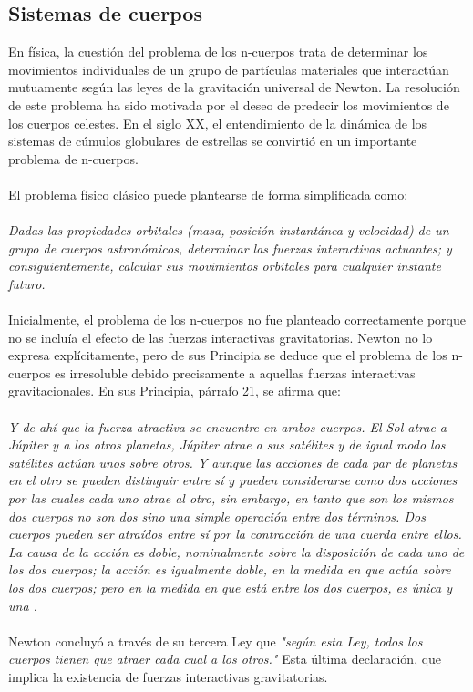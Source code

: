 \subsection{Sistemas de cuerpos}
En física, la cuestión del problema de los n-cuerpos trata de determinar los movimientos individuales de un grupo de partículas materiales que interactúan mutuamente según las leyes de la gravitación universal de Newton. La resolución de este problema ha sido motivada por el deseo de predecir los movimientos de los cuerpos celestes. En el siglo XX, el entendimiento de la dinámica de los sistemas de cúmulos globulares de estrellas se convirtió en un importante problema de n-cuerpos.\\\\
El problema físico clásico puede plantearse de forma simplificada como:\\\\
\textit{Dadas las propiedades orbitales (masa, posición instantánea y velocidad) de un grupo de cuerpos astronómicos, determinar las fuerzas interactivas actuantes; y consiguientemente, calcular sus movimientos orbitales para cualquier instante futuro.}\\\\
Inicialmente, el problema de los n-cuerpos no fue planteado correctamente porque no se incluía el efecto de las fuerzas interactivas gravitatorias. Newton no lo expresa explícitamente, pero de sus Principia se deduce que el problema de los n-cuerpos es irresoluble debido precisamente a aquellas fuerzas interactivas gravitacionales. En sus Principia, párrafo 21, se afirma que:\\\\
\textit{Y de ahí que la fuerza atractiva se encuentre en ambos cuerpos. El Sol atrae a Júpiter y a los otros planetas, Júpiter atrae a sus satélites y de igual modo los satélites actúan unos sobre otros. Y aunque las acciones de cada par de planetas en el otro se pueden distinguir entre sí y pueden considerarse como dos acciones por las cuales cada uno atrae al otro, sin embargo, en tanto que son los mismos dos cuerpos no son dos sino una simple operación entre dos términos. Dos cuerpos pueden ser atraídos entre sí por la contracción de una cuerda entre ellos. La causa de la acción es doble, nominalmente sobre la disposición de cada uno de los dos cuerpos; la acción es igualmente doble, en la medida en que actúa sobre los dos cuerpos; pero en la medida en que está entre los dos cuerpos, es única y una .}\\\\
Newton concluyó a través de su tercera Ley que \textit{"según esta Ley, todos los cuerpos tienen que atraer cada cual a los otros."} Esta última declaración, que implica la existencia de fuerzas interactivas gravitatorias.
